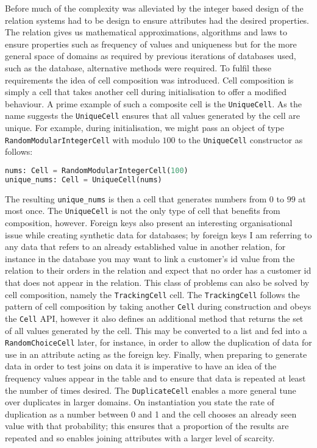 Before much of the complexity was alleviated by the integer based design of the
 relation systems had to be design to ensure attributes had
the desired properties. The  relation gives us mathematical
approximations, algorithms and laws to ensure properties such as frequency of
values and uniqueness but for the more general space of domains as required by
previous iterations of databases used, such as the  database,
alternative methods were required. To fulfil these requirements the idea of cell
composition was introduced. Cell composition is simply a cell that takes another cell
during initialisation to offer a modified behaviour. A prime example of such a
composite cell is the \lstinline{UniqueCell}. As the name suggests the
\lstinline{UniqueCell} ensures that all values generated by the cell are unique.
For example, during initialisation, we might pass an object of type
\lstinline{RandomModularIntegerCell} with modulo $100$ to the
\lstinline{UniqueCell} constructor as follows:
\begin{lstlisting}[language=Python]
nums: Cell = RandomModularIntegerCell(100)
unique_nums: Cell = UniqueCell(nums)
\end{lstlisting}
The resulting \lstinline{unique_nums} is then a cell that generates numbers from
$0$ to $99$ at most once. The \lstinline{UniqueCell} is not the only type of
cell that benefits from composition, however. Foreign keys also present an
interesting organisational issue while creating synthetic data for databases; by
foreign keys I am referring to any data that refers to an already established
value in another relation, for instance in the  database you
may want to link a customer's id value from the  relation to
their orders in the  relation and expect that no order has a
customer id that does not appear in the  relation. This class
of problems can also be solved by cell composition, namely the
\lstinline{TrackingCell} cell. The \lstinline{TrackingCell} follows the
pattern of cell composition by taking another \lstinline{Cell} during
construction and obeys the \lstinline{Cell} API, however it also defines an
additional method that returns the set of all values generated by the cell. This
may be converted to a list and fed into a \lstinline{RandomChoiceCell} later, for
instance, in order to allow the duplication of data for use in an attribute
acting as the foreign key.
Finally, when preparing to generate data in order to test joins on data it is
imperative to have an idea of the frequency values appear in the table and to ensure
that data is repeated at least the number of times desired. The
\lstinline{DuplicateCell} enables a more general tune over duplicates in larger
domains. On instantiation you state the rate of duplication as a number
between 0 and 1 and the cell chooses an already seen value with that
probability; this ensures that a proportion of the results are repeated and so
enables joining attributes with a larger level of scarcity.

